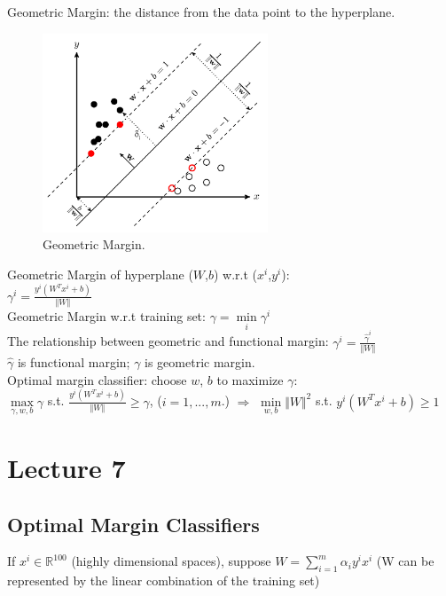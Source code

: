 \documentclass{article}
\begin{document}
\noindent
Geometric Margin: the distance from the data point to the hyperplane.
\begin{figure}[H]
	\centerline{
   \includegraphics[width=0.6\textwidth]{Fig5.png}}
   \caption{Geometric Margin.}
   \label{fig:example}
\end{figure}
Geometric Margin of hyperplane ($W$,$b$) w.r.t ($x^i$,$y^i$):\\
\indent
$\gamma^i = \frac{y^i(W^Tx^i+b)}{\Vert W \Vert}$\\
Geometric Margin w.r.t training set: $\gamma = \min\limits_{i}\gamma^i$\\
The relationship between geometric and functional margin: $\gamma^i = \frac{\hat{\gamma}^i}{\Vert W \Vert}$\\
$\hat{\gamma}$ is functional margin; $\gamma$ is geometric margin.\\

\noindent
Optimal margin classifier: choose $w$, $b$ to maximize $\gamma$:\\
\indent
$\max\limits_{\gamma,w,b}\gamma$ s.t. $\frac{y^i(W^Tx^i+b)}{\Vert W \Vert} \geq \gamma$, ($i = 1, ..., m$.) 
$\Rightarrow$ $\min\limits_{w,b} {\Vert W \Vert}^2$ s.t. $y^i(W^Tx^i+b) \geq 1 $

\section{Lecture 7}
\subsection{Optimal Margin Classifiers}
If $x^i \in \mathbb{R}^{100}$ (highly dimensional spaces), 
suppose $W = \sum\limits_{i=1}^m \alpha_iy^ix^i$ (W can be represented by the linear combination of the training set)\\
\end{document}
